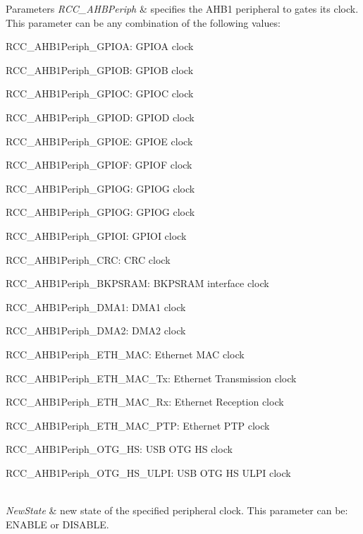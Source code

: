 \begin{DoxyParams}{Parameters}
{\em R\+C\+C\+\_\+\+A\+H\+B\+Periph} & specifies the A\+H\+B1 peripheral to gates its clock. This parameter can be any combination of the following values\+: \begin{DoxyItemize}
\item R\+C\+C\+\_\+\+A\+H\+B1\+Periph\+\_\+\+G\+P\+I\+OA\+: G\+P\+I\+OA clock \item R\+C\+C\+\_\+\+A\+H\+B1\+Periph\+\_\+\+G\+P\+I\+OB\+: G\+P\+I\+OB clock \item R\+C\+C\+\_\+\+A\+H\+B1\+Periph\+\_\+\+G\+P\+I\+OC\+: G\+P\+I\+OC clock \item R\+C\+C\+\_\+\+A\+H\+B1\+Periph\+\_\+\+G\+P\+I\+OD\+: G\+P\+I\+OD clock \item R\+C\+C\+\_\+\+A\+H\+B1\+Periph\+\_\+\+G\+P\+I\+OE\+: G\+P\+I\+OE clock \item R\+C\+C\+\_\+\+A\+H\+B1\+Periph\+\_\+\+G\+P\+I\+OF\+: G\+P\+I\+OF clock \item R\+C\+C\+\_\+\+A\+H\+B1\+Periph\+\_\+\+G\+P\+I\+OG\+: G\+P\+I\+OG clock \item R\+C\+C\+\_\+\+A\+H\+B1\+Periph\+\_\+\+G\+P\+I\+OG\+: G\+P\+I\+OG clock \item R\+C\+C\+\_\+\+A\+H\+B1\+Periph\+\_\+\+G\+P\+I\+OI\+: G\+P\+I\+OI clock \item R\+C\+C\+\_\+\+A\+H\+B1\+Periph\+\_\+\+C\+RC\+: C\+RC clock \item R\+C\+C\+\_\+\+A\+H\+B1\+Periph\+\_\+\+B\+K\+P\+S\+R\+AM\+: B\+K\+P\+S\+R\+AM interface clock \item R\+C\+C\+\_\+\+A\+H\+B1\+Periph\+\_\+\+D\+M\+A1\+: D\+M\+A1 clock \item R\+C\+C\+\_\+\+A\+H\+B1\+Periph\+\_\+\+D\+M\+A2\+: D\+M\+A2 clock \item R\+C\+C\+\_\+\+A\+H\+B1\+Periph\+\_\+\+E\+T\+H\+\_\+\+M\+AC\+: Ethernet M\+AC clock \item R\+C\+C\+\_\+\+A\+H\+B1\+Periph\+\_\+\+E\+T\+H\+\_\+\+M\+A\+C\+\_\+\+Tx\+: Ethernet Transmission clock \item R\+C\+C\+\_\+\+A\+H\+B1\+Periph\+\_\+\+E\+T\+H\+\_\+\+M\+A\+C\+\_\+\+Rx\+: Ethernet Reception clock \item R\+C\+C\+\_\+\+A\+H\+B1\+Periph\+\_\+\+E\+T\+H\+\_\+\+M\+A\+C\+\_\+\+P\+TP\+: Ethernet P\+TP clock \item R\+C\+C\+\_\+\+A\+H\+B1\+Periph\+\_\+\+O\+T\+G\+\_\+\+HS\+: U\+SB O\+TG HS clock \item R\+C\+C\+\_\+\+A\+H\+B1\+Periph\+\_\+\+O\+T\+G\+\_\+\+H\+S\+\_\+\+U\+L\+PI\+: U\+SB O\+TG HS U\+L\+PI clock \end{DoxyItemize}
\\
\hline
{\em New\+State} & new state of the specified peripheral clock. This parameter can be\+: E\+N\+A\+B\+LE or D\+I\+S\+A\+B\+LE. \\
\hline
\end{DoxyParams}

